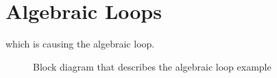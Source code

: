 \chapter{Algebraic Loops}
\label{chp:algebraicLoop}

 which is causing the algebraic loop.
\begin{figure}[!htb]
    \def\svgwidth{0.8\textwidth}
    
    \caption{Block diagram that describes the algebraic loop example}
    \label{fig:blockDiagramAlgLoop}
\end{figure}
